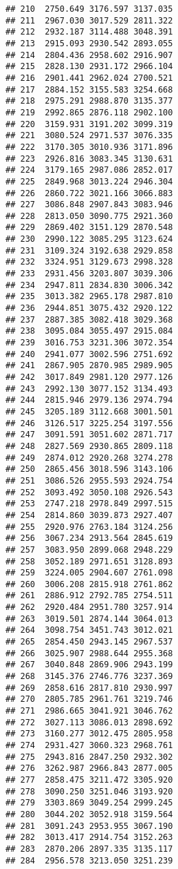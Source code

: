 \documentclass[
]{article}
\begin{document}
\begin{verbatim}
## 210  2750.649 3176.597 3137.035
## 211  2967.030 3017.529 2811.322
## 212  2932.187 3114.488 3048.391
## 213  2915.093 2930.542 2893.055
## 214  2804.436 2958.602 2916.907
## 215  2828.130 2931.172 2966.104
## 216  2901.441 2962.024 2700.521
## 217  2884.152 3155.583 3254.668
## 218  2975.291 2988.870 3135.377
## 219  2992.865 2876.118 2902.100
## 220  3159.931 3191.202 3099.319
## 221  3080.524 2971.537 3076.335
## 222  3170.305 3010.936 3171.896
## 223  2926.816 3083.345 3130.631
## 224  3179.165 2987.086 2852.017
## 225  2849.968 3013.224 2946.304
## 226  2860.722 3021.166 3066.883
## 227  3086.848 2907.843 3083.946
## 228  2813.050 3090.775 2921.360
## 229  2869.402 3151.129 2870.548
## 230  2990.122 3085.295 3123.624
## 231  3109.324 3192.638 2929.858
## 232  3324.951 3129.673 2998.328
## 233  2931.456 3203.807 3039.306
## 234  2947.811 2834.830 3006.342
## 235  3013.382 2965.178 2987.810
## 236  2944.851 3075.432 2920.122
## 237  2887.385 3082.418 3029.368
## 238  3095.084 3055.497 2915.084
## 239  3016.753 3231.306 3072.354
## 240  2941.077 3002.596 2751.692
## 241  2867.905 2870.985 2989.905
## 242  3017.849 2981.120 2977.126
## 243  2992.130 3077.152 3134.493
## 244  2815.946 2979.136 2974.794
## 245  3205.189 3112.668 3001.501
## 246  3126.517 3225.254 3197.556
## 247  3091.591 3051.602 2871.717
## 248  2827.569 2930.865 2809.118
## 249  2874.012 2920.268 3274.278
## 250  2865.456 3018.596 3143.106
## 251  3086.526 2955.593 2924.754
## 252  3093.492 3050.108 2926.543
## 253  2747.218 2978.849 2997.515
## 254  2814.860 3039.873 2927.407
## 255  2920.976 2763.184 3124.256
## 256  3067.234 2913.564 2845.619
## 257  3083.950 2899.068 2948.229
## 258  3052.189 2971.651 3128.893
## 259  3224.005 2904.607 2761.098
## 260  3006.208 2815.918 2761.862
## 261  2886.912 2792.785 2754.511
## 262  2920.484 2951.780 3257.914
## 263  3019.501 2874.144 3064.013
## 264  3098.754 3451.743 3012.021
## 265  2854.450 2943.145 2967.537
## 266  3025.907 2988.644 2955.368
## 267  3040.848 2869.906 2943.199
## 268  3145.376 2746.776 3237.369
## 269  2858.616 2817.810 2930.997
## 270  2805.785 2961.761 3219.746
## 271  2986.665 3041.921 3046.762
## 272  3027.113 3086.013 2898.692
## 273  3160.277 3012.475 2805.958
## 274  2931.427 3060.323 2968.761
## 275  2943.816 2847.250 2932.302
## 276  3262.987 2966.843 2877.005
## 277  2858.475 3211.472 3305.920
## 278  3090.250 3251.046 3193.920
## 279  3303.869 3049.254 2999.245
## 280  3044.202 3052.918 3159.564
## 281  3091.243 2953.955 3067.190
## 282  3013.417 2914.754 3152.263
## 283  2870.206 2897.335 3135.117
## 284  2956.578 3213.050 3251.239

\end{verbatim}
\end{document}

